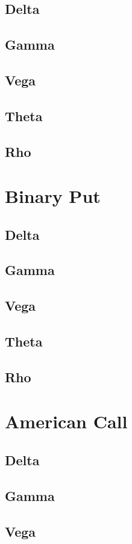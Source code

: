 \documentclass[12pt,a4paper]{article}
\begin{document}
\subsection{Delta}
\subsection{Gamma}
\subsection{Vega}
\subsection{Theta}
\subsection{Rho}

\section{Binary Put}
\subsection{Delta}
\subsection{Gamma}
\subsection{Vega}
\subsection{Theta}
\subsection{Rho}

\section{American Call}
\subsection{Delta}
\subsection{Gamma}
\subsection{Vega}
\end{document}

